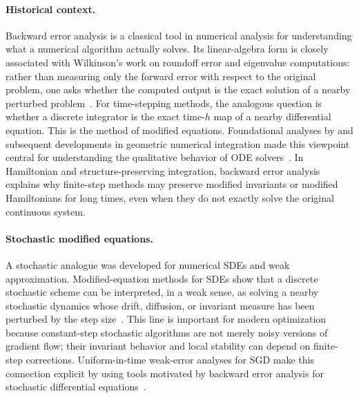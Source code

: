 \documentclass{article}
\begin{document}
\paragraph{Historical context.}
Backward error analysis is a classical tool in numerical analysis for understanding what a numerical algorithm actually solves.  Its linear-algebra form is closely associated with Wilkinson's work on roundoff error and eigenvalue computations: rather than measuring only the forward error with respect to the original problem, one asks whether the computed output is the exact solution of a nearby perturbed problem~\citep{wilkinson1963rounding,wilkinson1965algebraic,higham2002accuracy}.  For time-stepping methods, the analogous question is whether a discrete integrator is the exact time-$h$ map of a nearby differential equation.  This is the method of modified equations.  Foundational analyses by \citep{griffiths1986scope} and subsequent developments in geometric numerical integration made this viewpoint central for understanding the qualitative behavior of ODE solvers~\citep{calvo1994modified,hairer2006geometric}.  In Hamiltonian and structure-preserving integration, backward error analysis explains why finite-step methods may preserve modified invariants or modified Hamiltonians for long times, even when they do not exactly solve the original continuous system.

\paragraph{Stochastic modified equations.}
A stochastic analogue was developed for numerical SDEs and weak approximation.  Modified-equation methods for SDEs show that a discrete stochastic scheme can be interpreted, in a weak sense, as solving a nearby stochastic dynamics whose drift, diffusion, or invariant measure has been perturbed by the step size~\citep{shardlow2006modified,zygalakis2011existence,debussche2012weak}.  This line is important for modern optimization because constant-step stochastic algorithms are not merely noisy versions of gradient flow; their invariant behavior and local stability can depend on finite-step corrections.  Uniform-in-time weak-error analyses for SGD make this connection explicit by using tools motivated by backward error analysis for stochastic differential equations~\citep{feng2020uniform}.
\end{document}
